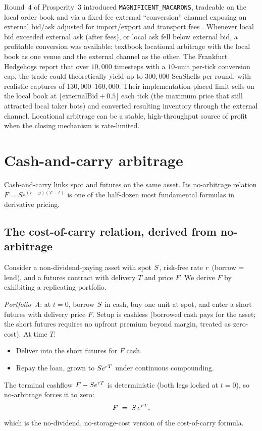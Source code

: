 \begin{prosperitybox}
Round~$4$ of Prosperity~$3$ introduced
\texttt{MAGNIFICENT\_MACARONS}, tradeable on the local order
book and via a fixed-fee external ``conversion'' channel
exposing an external bid/ask adjusted for import/export and
transport fees \citep{frankfurtHedgehogs2025imcP3}. Whenever
local bid exceeded external ask (after fees), or local ask fell
below external bid, a profitable conversion was available:
textbook locational arbitrage with the local book as one venue
and the external channel as the other. The Frankfurt Hedgehogs
report that over $10{,}000$ timesteps with a $10$-unit per-tick
conversion cap, the trade could theoretically yield up to
$300{,}000$ SeaShells per round, with realistic captures of
$130{,}000$--$160{,}000$. Their implementation placed limit
sells on the local book at $\lfloor\text{externalBid} +
0.5\rfloor$ each tick (the maximum price that still attracted
local taker bots) and converted resulting inventory through
the external channel. Locational arbitrage can be a stable,
high-throughput source of profit when the closing mechanism is
rate-limited.
\end{prosperitybox}

\section{Cash-and-carry arbitrage}
\label{sec:ch13_cash_carry}

Cash-and-carry links spot and futures on the same asset. Its
no-arbitrage relation $F = S e^{(r-y)(T-t)}$ is one of the
half-dozen most fundamental formulas in derivative pricing.

\subsection{The cost-of-carry relation, derived from no-arbitrage}
\label{sec:ch13_cost_of_carry_derivation}

Consider a non-dividend-paying asset with spot $S$, risk-free
rate $r$ (borrow = lend), and a futures contract with
delivery $T$ and price $F$. We derive $F$ by exhibiting a
replicating portfolio.

\emph{Portfolio~A}: at $t=0$, borrow $S$ in cash, buy one
unit at spot, and enter a short futures with delivery price $F$.
Setup is cashless (borrowed cash pays for the asset; the short
futures requires no upfront premium beyond margin, treated as
zero-cost). At time $T$:
\begin{itemize}
  \item Deliver into the short futures for $F$ cash.
  \item Repay the loan, grown to $S e^{r T}$ under
  continuous compounding.
\end{itemize}
The terminal cashflow $F - S e^{r T}$ is deterministic
(both legs locked at $t=0$), so no-arbitrage forces it to zero:
\begin{equation}
  F \;=\; S \, e^{r T},
  \label{eq:cost_of_carry_no_div}
\end{equation}
which is the no-dividend, no-storage-cost version of the
cost-of-carry formula.

